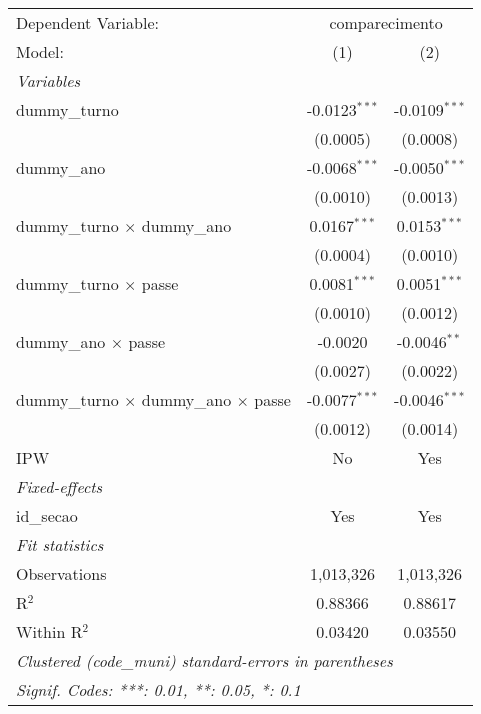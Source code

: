 
\begin{tabular}{lcc}
   \tabularnewline\midrule\midrule
   Dependent Variable: & \multicolumn{2}{c}{comparecimento}\\
   Model:                                              & (1)             & (2)\\
   \midrule \emph{Variables} &   &  \\
   dummy\_turno                                       & -0.0123$^{***}$ & -0.0109$^{***}$\\
                                                       & (0.0005)        & (0.0008)\\
   dummy\_ano                                         & -0.0068$^{***}$ & -0.0050$^{***}$\\
                                                       & (0.0010)        & (0.0013)\\
   dummy\_turno $\times$ dummy\_ano                 & 0.0167$^{***}$  & 0.0153$^{***}$\\
                                                       & (0.0004)        & (0.0010)\\
   dummy\_turno $\times$ passe                       & 0.0081$^{***}$  & 0.0051$^{***}$\\
                                                       & (0.0010)        & (0.0012)\\
   dummy\_ano $\times$ passe                         & -0.0020         & -0.0046$^{**}$\\
                                                       & (0.0027)        & (0.0022)\\
   dummy\_turno $\times$ dummy\_ano $\times$ passe & -0.0077$^{***}$ & -0.0046$^{***}$\\
                                                       & (0.0012)        & (0.0014)\\
   IPW                                                 & No              & Yes\\
   \midrule \emph{Fixed-effects} &   &  \\
   id\_secao                                          & Yes             & Yes\\
   \midrule \emph{Fit statistics} &   &  \\
   Observations                                        & 1,013,326       & 1,013,326\\
   R$^2$                                               & 0.88366         & 0.88617\\
   Within R$^2$                                        & 0.03420         & 0.03550\\
   \midrule\midrule\multicolumn{3}{l}{\emph{Clustered (code\_muni) standard-errors in parentheses}}\\
   \multicolumn{3}{l}{\emph{Signif. Codes: ***: 0.01, **: 0.05, *: 0.1}}\\
\end{tabular}


